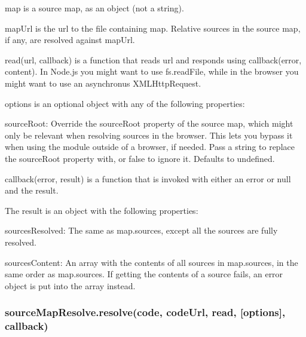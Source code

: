 \begin{DoxyItemize}
\item {\ttfamily map} is a source map, as an object (not a string).
\item {\ttfamily map\+Url} is the url to the file containing {\ttfamily map}. Relative sources in the source map, if any, are resolved against {\ttfamily map\+Url}.
\item {\ttfamily read(url, callback)} is a function that reads {\ttfamily url} and responds using {\ttfamily callback(error, content)}. In Node.\+js you might want to use {\ttfamily fs.\+read\+File}, while in the browser you might want to use an asynchronus {\ttfamily X\+M\+L\+Http\+Request}.
\item {\ttfamily options} is an optional object with any of the following properties\+:
\begin{DoxyItemize}
\item {\ttfamily source\+Root}\+: Override the {\ttfamily source\+Root} property of the source map, which might only be relevant when resolving sources in the browser. This lets you bypass it when using the module outside of a browser, if needed. Pass a string to replace the {\ttfamily source\+Root} property with, or {\ttfamily false} to ignore it. Defaults to {\ttfamily undefined}.
\end{DoxyItemize}
\item {\ttfamily callback(error, result)} is a function that is invoked with either an error or {\ttfamily null} and the result.
\end{DoxyItemize}

The result is an object with the following properties\+:


\begin{DoxyItemize}
\item {\ttfamily sources\+Resolved}\+: The same as {\ttfamily map.\+sources}, except all the sources are fully resolved.
\item {\ttfamily sources\+Content}\+: An array with the contents of all sources in {\ttfamily map.\+sources}, in the same order as {\ttfamily map.\+sources}. If getting the contents of a source fails, an error object is put into the array instead.
\end{DoxyItemize}

\subsubsection*{{\ttfamily source\+Map\+Resolve.\+resolve(code, code\+Url, read, \mbox{[}options\mbox{]}, callback)}}

